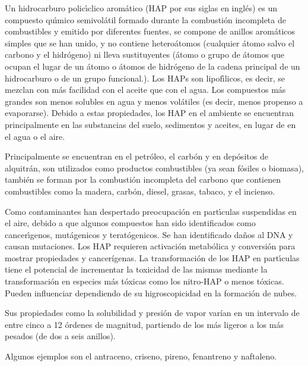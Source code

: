 Un hidrocarburo polic\'{\i}clico arom\'atico   ({HAP} por sus siglas en ingl\'es) es un compuesto qu\'{\i}mico semivol\'atil formado durante la combusti\'on incompleta de combustibles y emitido por diferentes fuentes, se compone de anillos arom\'aticos simples que se han unido, y no contiene hetero\'atomos (cualquier \'atomo salvo el carbono y el hidr\'o\-ge\-no) ni lleva sustituyentes (\'atomo o grupo de \'atomos que ocupan el lugar de un \'atomo o \'atomos de hidr\'ogeno de la cadena principal de un hidrocarburo o de un grupo funcional.). Los HAPs son lipof\'{\i}licos, es decir, se mezclan con m\'as facilidad con el aceite que con el agua. Los compuestos m\'as grandes son menos solubles en agua y menos vol\'atiles (es decir, menos propenso a evaporarse). Debido a estas propiedades, los HAP en el  ambiente se encuentran principalmente en las substancias del suelo, sedimentos y aceites, en lugar de en el agua o el aire. 

Principalmente se encuentran en el petr\'oleo, el carb\'on y en dep\'ositos de alquitr\'an, son utilizados como productos combustibles (ya sean f\'osiles o biomasa), tambi\'en se forman por la combusti\'on incompleta del carbono que contienen combustibles como la madera, carb\'on, diesel, grasas, tabaco, y el incienso.

Como contaminantes han despertado preocupaci\'on en part\'{\i}culas suspendidas en el aire, debido a que algunos compuestos han sido identificados como cancer\'{\i}genos, mut\'agenicos y terat\'ogenicos. Se han identificado da\~nos al DNA y causan mutaciones. Los HAP requieren activaci\'on metab\'olica y conversi\'on para mostrar propiedades  y cancerígenas. La transformaci\'on de los HAP en part\'{\i}culas tiene el potencial de incrementar la toxicidad de las mismas mediante la transformación en especies m\'as t\'oxicas como los nitro-HAP o menos t\'oxicas.  Pueden influenciar dependiendo de su higroscopicidad en la formaci\'on de nubes.

Sus propiedades como la solubilidad y presi\'on de vapor varían en un intervalo de entre cinco a 12 \'ordenes de magnitud, partiendo de los m\'as ligeros a los m\'as pesados (de dos a seis anillos).

Algunos ejemplos son el antraceno, criseno, pireno, fenantreno y naftaleno.

